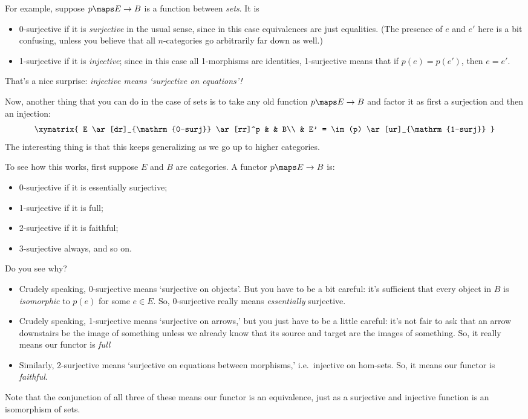 \documentclass[12pt]{amsart}
\begin{document}
For example, suppose $p\maps E\to B$ is a function between \emph{sets}.  It
is
\begin{itemize}
\item 0-surjective if it is \emph{surjective} in the usual sense, since in
  this case equivalences are just equalities.  (The presence of $e$
  and $e'$ here is a bit confusing, unless you believe that all
  $n$-categories go arbitrarily far down as well.)
\item 1-surjective if it is \emph{injective}; since in this case all
  1-morphisms are identities, 1-surjective means that if $p(e)=p(e')$,
  then $e=e'$.
\end{itemize}

That's a nice surprise: \emph{injective means `surjective on
equations'!}  

Now, another thing that you can do in the case of sets is to take any
old function $p\maps E\to B$ and factor it as first a surjection and then
an injection:
\[\xymatrix{
  E \ar[dr]_{\mathrm{0-surj}} \ar[rr]^p & & B\\
  & E' = \im(p) \ar[ur]_{\mathrm{1-surj}}
}\]
The interesting thing is that this keeps generalizing as we go up to
higher categories.

To see how this works, first suppose $E$ and $B$ are categories.  
A functor $p\maps E\to B$ is:
\begin{itemize}
\item 0-surjective if it is essentially surjective;
\item 1-surjective if it is full;
\item 2-surjective if it is faithful;
\item 3-surjective always, and so on.
\end{itemize}

Do you see why?
\begin{itemize}
\item
Crudely speaking, 0-surjective means `surjective on objects'.  But
you have to be a bit careful: it's sufficient that every object in 
$B$ is \emph{isomorphic} to $p(e)$ for some $e \in E$.  So,
0-surjective really means \emph{essentially} surjective.
\item
Crudely speaking,
1-surjective means `surjective on arrows,' but you just have to be a
little careful: it's not fair to ask that an arrow downstairs be the
image of something unless we already know that its source and target
are the images of something.  So, it really means our functor
is \emph{full}
\item
Similarly, 2-surjective means `surjective on equations
between morphisms,' i.e.\ injective on hom-sets.  So, it means
our functor is \emph{faithful}.  
\end{itemize}
Note that the conjunction of all three of these means our functor
is an equivalence, just as a surjective and injective function is
an isomorphism of sets.
\end{document}
